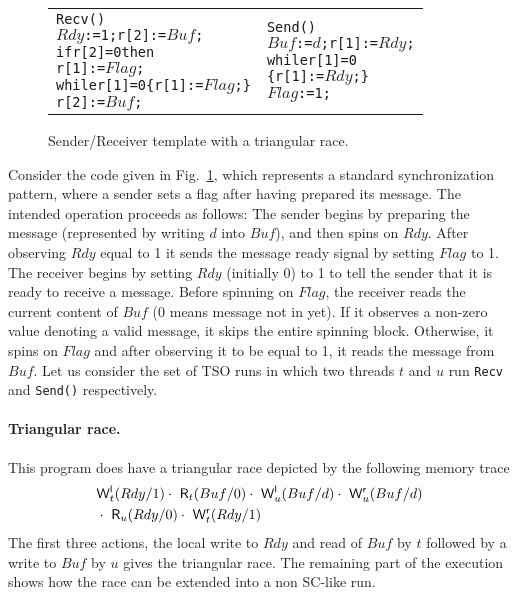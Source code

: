 \begin{figure}[th]
{\small
\begin{tabular}{p{}p{}}
\begin{alltt}Recv()
 \(Rdy\):=1; r[2]:=\(Buf\);
 if r[2]=0 then
   r[1]:=\(Flag\);
   while r[1]=0 \{r[1]:=\(Flag\);\}
   r[2]:=\(Buf\);\end{alltt}
&
\begin{alltt}Send()
 \(Buf\):=\(d\); r[1]:=\(Rdy\);
 while r[1]=0 
 \{ r[1]:=\(Rdy\); \}
 \(Flag\):=1;\end{alltt}
\end{tabular}
}
\caption{Sender/Receiver template with a triangular race.}
\label{fig:send-receive}
\end{figure}

Consider the code given in Fig.~\ref{fig:send-receive}, which represents a standard synchronization pattern, where a sender sets a flag after having prepared its message.
The intended operation proceeds as follows:
The sender begins by preparing the message (represented by writing $d$ into $Buf$), and then spins on $Rdy$.
After observing $Rdy$ equal to 1 it sends the message ready signal by setting $Flag$ to 1.
The receiver begins by setting $Rdy$ (initially 0) to 1 to tell the sender that it is ready to receive a message.
Before spinning on $Flag$, the receiver reads the current content of $Buf$ (0 means message not in yet).
If it observes a non-zero value denoting a valid message, it skips the entire spinning block.
Otherwise, it spins on $Flag$ and after observing it to be equal to 1, it reads the message from $Buf$.
Let us consider the set of TSO runs in which two threads $t$ and $u$ run {\tt Recv} and {\tt Send()} respectively.

\paragraph{Triangular race.}
This program does have a triangular race depicted by the following memory trace
{\small
\begin{eqnarray*}
& \mathsf{W}^{\mathsf{l}}_{t}(Rdy/1) \cdot\ \mathsf{R}_{t}(Buf/0)\cdot\ \mathsf{W}^{\mathsf{l}}_{u}(Buf/d) \cdot\ \mathsf{W}^{\mathsf{r}}_{u}(Buf/d)\\
&\cdot\ \mathsf{R}_{u}(Rdy/0)\cdot\ \mathsf{W}^{\mathsf{r}}_{t}(Rdy/1)
\end{eqnarray*}
}
The first three actions, the local write to $Rdy$ and read of $Buf$ by $t$ followed by a write to $Buf$ by $u$ gives the triangular race.
The remaining part of the execution shows how the race can be extended into a non SC-like run. 

